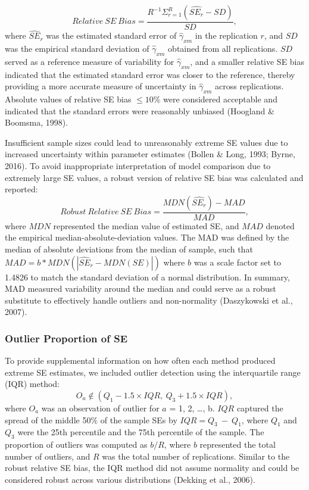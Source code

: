 \documentclass[
  man]{apa6}
\begin{document}
\begin{equation}
Relative\ SE\ Bias = \frac{R^{-1}\Sigma^{R}_{r = 1}(\widehat{SE_{r}} - SD)}{SD},
\end{equation}
where \(\widehat{SE}_{r}\) was the estimated standard error of \(\hat{\gamma}_{xm}\) in the replication \(r\), and \(SD\) was the empirical standard deviation of \(\hat{\gamma}_{xm}\) obtained from all replications. \(SD\) served as a reference measure of variability for \(\hat{\gamma}_{xm}\), and a smaller relative SE bias indicated that the estimated standard error was closer to the reference, thereby providing a more accurate measure of uncertainty in \(\hat{\gamma}_{xm}\) across replications. Absolute values of relative SE bias \(\le 10\%\) were considered acceptable and indicated that the standard errors were reasonably unbiased (Hoogland \& Boomsma, 1998).

Insufficient sample sizes could lead to unreasonably extreme SE values due to increased uncertainty within parameter estimates (Bollen \& Long, 1993; Byrne, 2016). To avoid inappropriate interpretation of model comparison due to extremely large SE values, a robust version of relative SE bias was calculated and reported:
\begin{equation}
Robust\ Relative\ SE\ Bias = \frac{MDN(\widehat{SE_{r}}) - MAD}{MAD},
\end{equation}
where \(MDN\) represented the median value of estimated SE, and \(MAD\) denoted the empirical median-absolute-deviation values. The MAD was defined by the median of absolute deviations from the median of sample, such that \(MAD = b*MDN(|\widehat{SE}_{r} - MDN(SE)|)\) where \(b\) was a scale factor set to 1.4826 to match the standard deviation of a normal distribution. In summary, MAD measured variability around the median and could serve as a robust substitute to effectively handle outliers and non-normality (Daszykowski et al., 2007).

\subsubsection{Outlier Proportion of SE}\label{outlier-proportion-of-se}

To provide supplemental information on how often each method produced extreme SE estimates, we included outlier detection using the interquartile range (IQR) method:
\begin{equation}
O_{a} \not\in (Q_{1} - 1.5 \times IQR, \ Q_{3} + 1.5 \times IQR),
\end{equation}
where \(O_{a}\) was an observation of outlier for \(a\) = 1, 2, \ldots, b. \(IQR\) captured the spread of the middle 50\(\%\) of the sample SEs by \(IQR = Q_{3} \ - \ Q_{1}\), where \(Q_{1}\) and \(Q_{3}\) were the 25th percentile and the 75th percentile of the sample. The proportion of outliers was computed as \(b/R\), where \(b\) represented the total number of outliers, and \(R\) was the total number of replications. Similar to the robust relative SE bias, the IQR method did not assume normality and could be considered robust across various distributions (Dekking et al., 2006).
\end{document}
